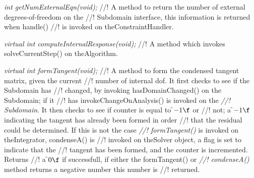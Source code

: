 {\em int getNumExternalEqn(void);}
//! A method to return the number of external degrees-of-freedom on the
//! Subdomain interface, this information is returned when handle()
//! is invoked on \p theConstraintHandler.

{\em     virtual int  computeInternalResponse(void);}
//! A method which invokes solveCurrentStep() on \p theAlgorithm.

{\em     virtual int  formTangent(void);}
//! A method to form the condensed tangent matrix, given the current
//! number of internal dof. It first checks to see if the Subdomain has
//! changed, by  invoking hasDomainChanged() on the Subdomain; if it
//! has invokeChangeOnAnalysis() is invoked on the {\em
//! Subdomain}. It then checks to see if \p counter is equal to \f$-1\f$ or
//! not; a \f$-1\f$ indicating the tangent has already been formed in order
//! that the residual could be determined. If this is not the case {\em
//! formTangent()} is invoked on \p theIntegrator, condenseA() is
//! invoked on \p theSolver object, a flag is set to indicate that the
//! tangent has been formed, and the \p counter is incremented. Returns
//! a \f$0\f$ if successfull, if either the formTangent() or {\em
//! condenseA()} method returns a negative number this number is
//! returned.  

